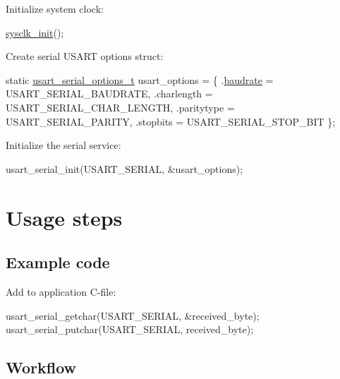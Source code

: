 \begin{DoxyEnumerate}
\item Initialize system clock\-:
\begin{DoxyItemize}
\item 
\begin{DoxyCode}
 \hyperlink{group__sysclk__group_ga242399e48a97739c88b4d0c00f6101de}{sysclk\_init}(); 
\end{DoxyCode}

\end{DoxyItemize}
\item Create serial U\-S\-A\-R\-T options struct\-:
\begin{DoxyItemize}
\item 
\begin{DoxyCode}
        \textcolor{keyword}{static} \hyperlink{structusart__rs232__options}{usart\_serial\_options\_t} usart\_options = \{
           .\hyperlink{structusart__rs232__options_a2c48c35d680d4805d357677d7d352fd0}{baudrate} = USART\_SERIAL\_BAUDRATE,
           .charlength = USART\_SERIAL\_CHAR\_LENGTH,
           .paritytype = USART\_SERIAL\_PARITY,
           .stopbits = USART\_SERIAL\_STOP\_BIT
        \};
\end{DoxyCode}

\end{DoxyItemize}
\item Initialize the serial service\-:
\begin{DoxyItemize}
\item 
\begin{DoxyCode}
 usart\_serial\_init(USART\_SERIAL, &usart\_options);
\end{DoxyCode}

\end{DoxyItemize}
\end{DoxyEnumerate}\hypertarget{serial_quickstart_serial_basic_use_case_usage}{}\section{Usage steps}\label{serial_quickstart_serial_basic_use_case_usage}
\hypertarget{serial_quickstart_serial_basic_use_case_usage_code}{}\subsection{Example code}\label{serial_quickstart_serial_basic_use_case_usage_code}
Add to application C-\/file\-: 
\begin{DoxyCode}
        usart\_serial\_getchar(USART\_SERIAL, &received\_byte);
        usart\_serial\_putchar(USART\_SERIAL, received\_byte);
\end{DoxyCode}
\hypertarget{serial_quickstart_serial_basic_use_case_usage_flow}{}\subsection{Workflow}\label{serial_quickstart_serial_basic_use_case_usage_flow}

